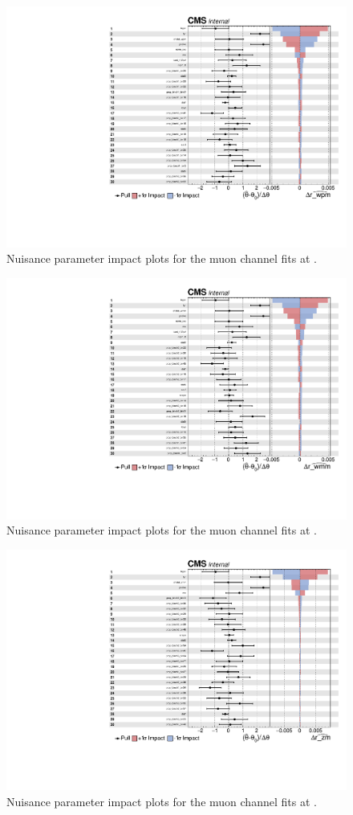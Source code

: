\begin{figure}
\centering
\includegraphics[width=0.75\linewidth]{plots/Impacts/plots_wpm.pdf}
\caption{Nuisance parameter impact plots for the \Wp muon channel fits at \sh.}
\label{fig:impacts:wpm:13}
\end{figure}

\begin{figure}
\centering
\includegraphics[width=0.75\linewidth]{plots/Impacts/plots_wmm.pdf}
\caption{Nuisance parameter impact plots for the \Wm muon channel fits at \sh.}
\label{fig:impacts:wpm:13}
\end{figure}

\begin{figure}
\centering
\includegraphics[width=0.75\linewidth]{plots/Impacts/plots_zm.pdf}
\caption{Nuisance parameter impact plots for the \Z muon channel fits at \sh.}
\label{fig:impacts:wpm:13}
\end{figure}